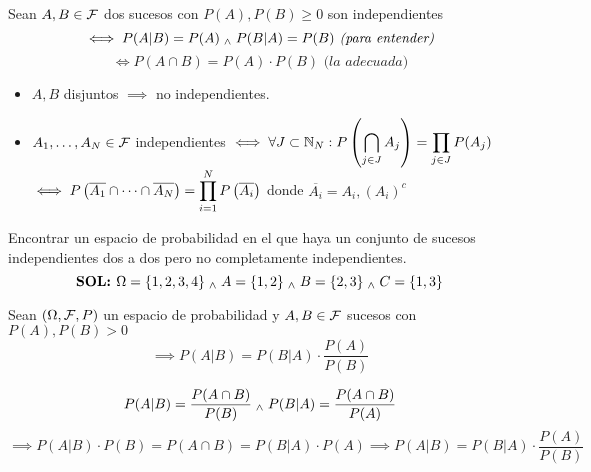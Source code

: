 \begin{defn}[Independencia]
	Sean $A,B \in \mathcal{F}$ dos sucesos con $P(A), P(B) \geq 0$ son independientes
	\[\iff P(A|B) = P(A) \; _{\wedge} \; P(B|A)=P(B) \textit{ (para entender)}\]
	\[\iff P(A\cap B)=P(A)\cdot P(B) \textit{ (la adecuada)}\]
	\begin{itemize}[topsep=1pt, itemsep=1pt,parsep=3pt]
		\item $A, B$ disjuntos $\implies$ no independientes.
		\item $A_1, \dots, A_N \in \mathcal{F}$ independientes $\displaystyle \iff \forall J \subset \mathbb{N}_N: P\left(\bigcap_{j\in J} A_j\right)=\prod_{j\in J}P(A_j)$ \\
		      $\displaystyle \iff P\left(\overline{A_1}\cap\cdots\cap\overline{A_N}\right)=\prod_{i=1}^N P\left(\overline{A_i}\right)$ donde $\overline{A_i}=A_i, (A_i)^c$
	\end{itemize}
\end{defn}
\begin{ejer}
	Encontrar un espacio de probabilidad en el que haya un conjunto de sucesos independientes dos a dos pero no completamente independientes.
	\[\textbf{\boldmath SOL: }\Omega = \{1, 2, 3, 4\} \; _{\wedge} \; A=\{1, 2\} \; _{\wedge} \; B=\{2, 3\} \; _{\wedge} \; C=\{1,3\}\]
\end{ejer}
\vfill{}
\begin{prop}
	Sean $(\Omega, \mathcal{F}, P)$ un espacio de probabilidad y $A, B \in \mathcal{F}$ sucesos con $P(A), P(B)>0$
	\[\implies P(A|B)=P(B|A)\cdot \frac{P(A)}{P(B)}\]
	\begin{dem}
		\[P(A|B)=\frac{P(A\cap B)}{P(B)} \; _{\wedge} \; P(B|A)=\frac{P(A\cap B)}{P(A)}\]
		\[\implies P(A|B)\cdot P(B) = P(A\cap B) = P(B|A)\cdot P(A) \implies P(A|B)=P(B|A)\cdot \frac{P(A)}{P(B)}\]
	\end{dem}
\end{prop}
\vspace{-1.25cm}
